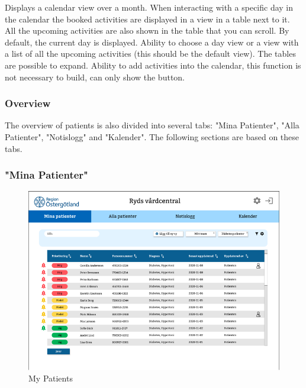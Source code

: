 \documentclass{scrreprt}
\begin{document}
Displays a calendar view over a month. When interacting with a specific day in the calendar the booked activities are displayed in a view in a table next to it. All the upcoming activities are also shown in the table that you can scroll. By default, the current day is displayed. Ability to choose a day view or a view with a list of all the upcoming activities (this should be the default view). The tables are possible to expand. Ability to add activities into the calendar, this function is not necessary to build, can only show the button.


\subsubsection{Overview}
The overview of patients is also divided into several tabs: "Mina Patienter", "Alla Patienter", "Notislogg" and "Kalender". The following sections are based on these tabs. 

\subsubsection{"Mina Patienter"}
\begin{figure}[h!]
    \centering
    \includegraphics[width=15cm]{mypat.png}
    \caption{My Patients}
    \label{fig: mypat}
\end{figure}
\end{document}
